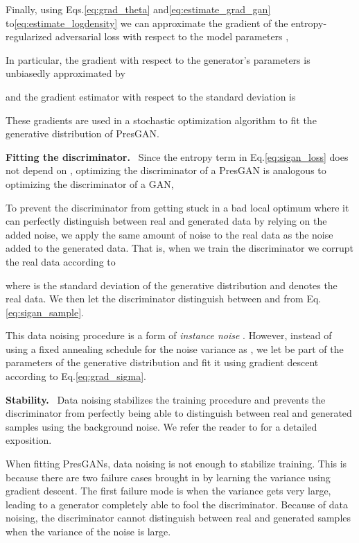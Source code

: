 \documentclass[11pt]{article}
\DeclareRobustCommand{\parhead}[1]{\textbf{#1}~}
\begin{document}
Finally, using 
Eqs.\nobreakspace \ref {eq:grad_theta} and\nobreakspace   \ref {eq:estimate_grad_gan} to\nobreakspace  \ref {eq:estimate_logdensity} 
we can approximate the gradient of the entropy-regularized adversarial loss with respect to the model parameters , 

In particular, the gradient with respect to the generator's parameters  is unbiasedly approximated by

and the gradient estimator with respect to the standard deviation  is 

These gradients are used in a stochastic optimization algorithm to fit the generative distribution of Pres\gls{GAN}.

\parhead{Fitting the discriminator.}
Since the entropy term in Eq.\nobreakspace \ref {eq:sigan_loss} does not depend on , optimizing the discriminator of a Pres\gls{GAN} is analogous to optimizing the discriminator of a \gls{GAN},


To prevent the discriminator from getting stuck in a bad local optimum where it can perfectly distinguish between real and generated data by relying on the added noise, we apply the same amount of noise to the real data  as the noise added to the generated data. That is, when we train the discriminator we corrupt the real data according to

where  is the standard deviation of the generative distribution and  denotes the real data. 
We then let the discriminator distinguish between  and  from Eq.\nobreakspace \ref {eq:sigan_sample}.

This data noising procedure is a form of \emph{instance noise} \citep{sonderby2016amortised}. However, instead of using a fixed annealing schedule for the noise variance as \citet{sonderby2016amortised}, we let  be part of the parameters of the generative distribution and fit it using gradient descent according to Eq.\nobreakspace \ref {eq:grad_sigma}.

\parhead{Stability.} Data noising stabilizes the training procedure and prevents the discriminator from perfectly being able to distinguish between real and generated samples using the background noise. We refer the reader to \citet{ferenc2016instance} for a detailed exposition. 

When fitting Pres\glspl{GAN}, data noising is not enough to stabilize training. This is because there are two failure cases brought in by learning the variance  using gradient descent. The first failure mode is when the variance gets very large, leading to a generator completely able to fool the discriminator. Because of data noising, the discriminator cannot distinguish between real and generated samples when the variance of the noise is large. 
\end{document}
